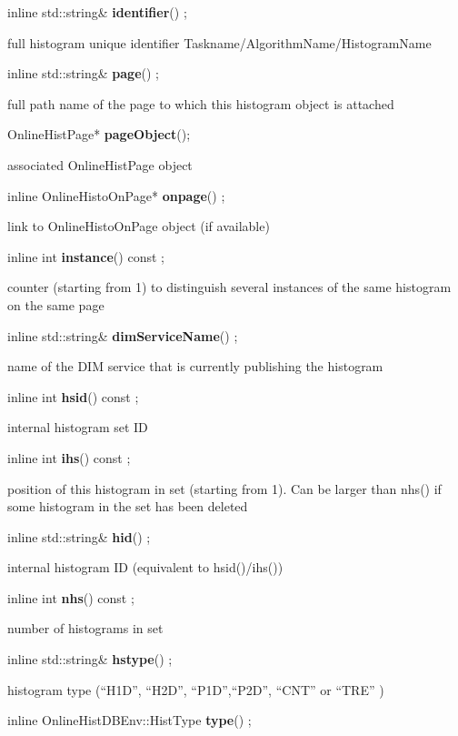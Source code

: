 \item    inline std::string\& {\bf identifier}() ;

 full histogram unique identifier Taskname/AlgorithmName/HistogramName


\item    inline std::string\& {\bf page}() ;

 full path name of the page to which this histogram object is attached


\item    OnlineHistPage* {\bf pageObject}();


 associated OnlineHistPage object


\item    inline OnlineHistoOnPage* {\bf onpage}() ;

 link to OnlineHistoOnPage object (if available)


\item    inline int {\bf instance}() const ;

 counter (starting from 1) to distinguish several instances of the same histogram on the same page


\item    inline std::string\& {\bf dimServiceName}() ;

 name of the DIM service that is currently publishing the histogram


\item    inline int {\bf hsid}() const ;

 internal histogram set ID


\item    inline int {\bf ihs}() const ;

 position of this histogram in set (starting from 1). Can be larger than nhs() if some histogram in the set has been deleted


\item    inline std::string\& {\bf hid}() ;

 internal histogram ID (equivalent to hsid()/ihs())


\item    inline int {\bf nhs}() const ;

 number of histograms in set


\item    inline std::string\& {\bf hstype}() ;

 histogram type (``H1D'', ``H2D'', ``P1D'',``P2D'', ``CNT'' or ``TRE'' )


\item    inline OnlineHistDBEnv::HistType {\bf type}() ;

